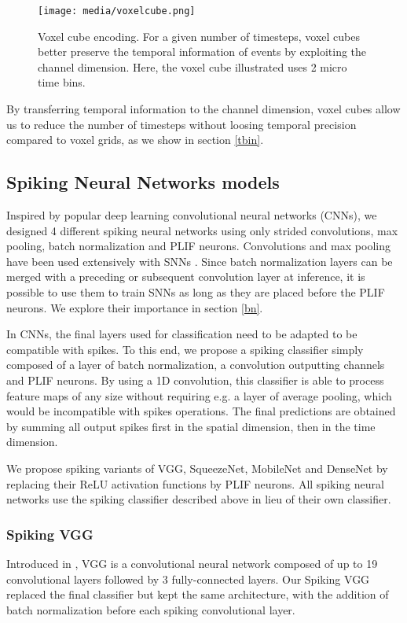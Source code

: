 \documentclass[conference]{IEEEtran}
\begin{document}
\begin{figure}[tb]
\centerline{\texttt{[image: media/voxelcube.png]}}
\caption{Voxel cube encoding. For a given number of timesteps, voxel cubes better preserve the temporal information of events by exploiting the channel dimension. Here, the voxel cube illustrated uses 2 micro time bins.}
\label{fig:voxelcube}
\end{figure}

By transferring temporal information to the channel dimension, voxel cubes allow us to reduce the number of timesteps  without loosing temporal precision compared to voxel grids, as we show in section \ref{tbin}.

\subsection{Spiking Neural Networks models}

Inspired by popular deep learning convolutional neural networks (CNNs), we designed 4 different spiking neural networks using only strided convolutions, max pooling, batch normalization and PLIF neurons. Convolutions and max pooling have been used extensively with SNNs \cite{loicijcnn} \cite{pool}. Since batch normalization layers can be merged with a preceding or subsequent convolution layer at inference, it is possible to use them to train SNNs as long as they are placed before the PLIF neurons. We explore their importance in section \ref{bn}. 

In CNNs, the final layers used for classification need to be adapted to be compatible with spikes. To this end, we propose a spiking classifier simply composed of a layer of batch normalization, a  convolution outputting  channels and PLIF neurons. By using a 1D convolution, this classifier is able to process feature maps of any size without requiring e.g. a layer of average pooling, which would be incompatible with spikes operations. The final predictions are obtained by summing all output spikes first in the spatial dimension, then in the time dimension. 

We propose spiking variants of VGG, SqueezeNet, MobileNet and DenseNet by replacing their ReLU activation functions by PLIF neurons. All spiking neural networks use the spiking classifier described above in lieu of their own classifier. \\





\subsubsection{Spiking VGG} 
Introduced in \cite{vgg}, VGG is a convolutional neural network composed of up to 19 convolutional layers followed by 3 fully-connected layers. Our Spiking VGG replaced the final classifier but kept the same architecture, with the addition of batch normalization before each spiking convolutional layer. \\
\end{document}
